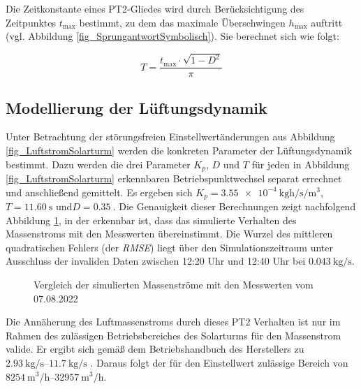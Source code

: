 Die Zeitkonstante eines PT2-Gliedes wird durch Berücksichtigung des Zeitpunktes $t_{\mathrm{max}}$ bestimmt, zu dem das maximale Überschwingen $h_{\mathrm{max}}$ auftritt (vgl. Abbildung \ref{fig_SprungantwortSymbolisch}).
Sie berechnet sich wie folgt:

\begin{equation} \label{eq_BerechnungT}
    T = \frac{t_{\mathrm{max}} \cdot \sqrt{1-D^2}}{\pi}
\end{equation}


\subsection{Modellierung der Lüftungsdynamik} \label{subsec_BeschreibungLüftungsDyn}
Unter Betrachtung der störungsfreien Einstellwertänderungen aus Abbildung \ref{fig_LuftstromSolarturm} werden die konkreten Parameter der Lüftungsdynamik bestimmt.
Dazu werden die drei Parameter $K_p$, $D$ und $T$ für jeden in Abbildung \ref{fig_LuftstromSolarturm} erkennbaren Betriebspunktwechsel separat errechnet und anschließend gemittelt.
Es ergeben sich $K_p = \SI{3.55e-4}{\kilo\gram\hour\per\second\per\metre\cubed}$, $T = \SI{11.60}{\second}$ und\linebreak $D = \SI{0.35}{}$.
Die Genauigkeit dieser Berechnungen zeigt nachfolgend Abbildung \ref{fig_LuftstromplusSimulativ}, in der erkennbar ist, dass das simulierte Verhalten des Massenstroms mit den Messwerten übereinstimmt.
Die Wurzel des mittleren quadratischen Fehlers (der \textit{RMSE}) liegt über den Simulationszeitraum unter Ausschluss der invaliden Daten zwischen 12:20 Uhr und 12:40 Uhr bei $\SI{0.043}{\kilo\gram\per\second}$.

\begin{figure}[h!]
    \centering
    \setlength{\fboxsep}{1pt}
    \setlength{\fboxrule}{1pt}
    \caption[Vergleich der simulierten Massenströme mit den Messwerten vom 07.08.2022]{Vergleich der simulierten Massenströme mit den Messwerten vom 07.08.2022}
    \label{fig_LuftstromplusSimulativ}
\end{figure}

Die Annäherung des Luftmassenstroms durch dieses PT2 Verhalten ist nur im Rahmen des zulässigen Betriebsbereiches des Solarturms für den Massenstrom valide.
Er ergibt sich gemäß dem Betriebshandbuch des Herstellers zu $\SIrange{2.93}{11.7}{\kilo\gram\per\second}$ \cite[S.28]{HandbuchJülich}.
Daraus folgt der für den Einstellwert zulässige Bereich von $\SIrange{8254}{32957}{\metre\cubed\per\hour}$.

